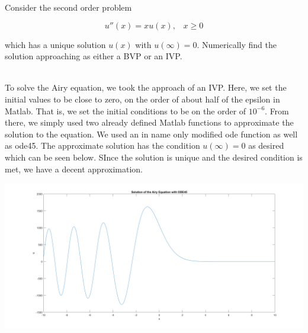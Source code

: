 Consider the second order problem

$$u''(x)=xu(x),\;\;\;x\geq0$$

which has a unique solution $u(x)$ with $u(\infty)=0$. Numerically find the solution approaching as
either a BVP or an IVP.

\begin{solution}\renewcommand{\qedsymbol}{}\ \\
    To solve the Airy equation, we took the approach of an IVP. Here, we set the initial values to be
    close to zero, on the order of about half of the epsilon in Matlab. That is, we set the initial
    conditions to be on the order of $10^{-6}$. From there, we simply used two already defined Matlab
    functions to approximate the solution to the equation. We used an in name only modified ode function
    as well as ode45. The approximate solution has the condition $u(\infty)=0$ as desired which can be
    seen below. SInce the solution is unique and the desired condition is met, we have a decent
    approximation.\\
    \begin{center}
        \includegraphics[scale=0.15]{4.PNG}
    \end{center}

\end{solution}

\newpage
